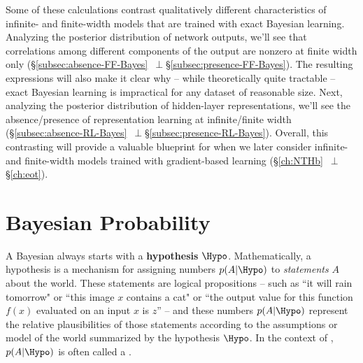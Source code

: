 Some of these calculations
contrast qualitatively different characteristics of infinite- and finite-width models that are trained with exact Bayesian learning.
Analyzing the posterior distribution of network outputs, we'll see that correlations among different components of the output are nonzero at finite width only (\S\ref{subsec:absence-FF-Bayes}~$\!\perp$\S\ref{subsec:presence-FF-Bayes}). 
The resulting expressions will also make it clear why -- while theoretically quite tractable --  exact Bayesian learning is impractical for any dataset of reasonable size.
Next, analyzing the posterior distribution of hidden-layer representations, we'll see the absence/presence of representation learning at infinite/finite width (\S\ref{subsec:absence-RL-Bayes}~$\!\perp$\S\ref{subsec:presence-RL-Bayes}).
Overall, this contrasting will provide a valuable blueprint for when we later consider infinite- and finite-width models trained with gradient-based learning (\S\ref{ch:NTHb}~$\!\perp$\S\ref{ch:eot}).







 
 
 


















\section{Bayesian Probability}\label{sec:PP-Bayes}
A Bayesian
always starts with a \textbf{hypothesis} $\Hypo$. Mathematically, a hypothesis is a mechanism for assigning numbers $p(A\vert\Hypo)$ to \emph{statements} $A$ about the world. These statements are logical propositions -- such as ``it will rain tomorrow" or ``this image $x$ contains a cat" or ``the output value for this function $f(x)$ evaluated on an input $x$ is $z$'' -- and these numbers $p(A\vert\Hypo)$ represent the relative plausibilities of those statements according to the assumptions or model of the world summarized by the hypothesis $\Hypo$.
In the context of , $p(A\vert\Hypo)$ is often called a .

